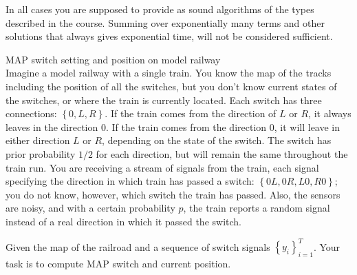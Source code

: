 \documentclass[a4paper,twoside=false,abstract=false,numbers=noenddot,
titlepage=false,headings=small,parskip=half,version=last]{scrartcl}
\begin{document}
In all cases you are supposed to provide as sound algorithms of the types
described in the course.
Summing over exponentially many terms and other
solutions that always gives exponential time, will not be considered
sufficient.
\begin{exercise}{2} MAP switch setting and position on model railway \\ 
    Imagine a model railway with a single train. You know the map of the tracks
    including the position of all the switches, but you don't know current states
    of the switches, or where the train is currently located. Each switch has three
    connections: $\left\{0,L,R\right\}$. If the train comes from the direction of
    $L$ or $R$, it always
    leaves in the direction $0$. If the train comes from the direction $0$, it will
    leave in either direction $L$ or $R$, depending on the state of the switch. The
    switch has prior probability $1/2$ for each direction, but will remain the same
    throughout the train run. You are receiving a stream of signals from the train,
    each signal specifying the direction in which train has passed a switch: 
    $\left\{0L,0R,L0,R0\right\}$; you do not know, however, 
    which switch the train has passed.
    Also, the sensors are noisy, and with a certain probability $p$, the train
    reports a random signal instead of a real direction in which it passed the
    switch.

    Given the map of the railroad and a sequence of switch signals
    $\left\{ y_i \right\}_{i=1}^T$. Your task is to compute MAP switch and current
    position.
\end{exercise}
\end{document}
